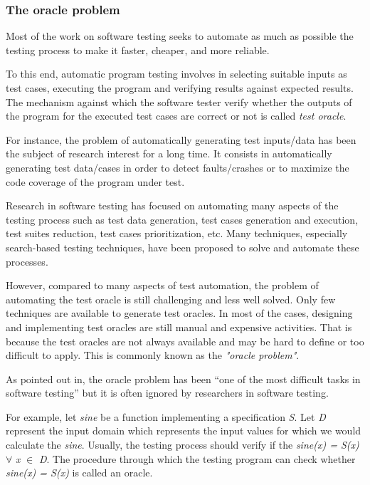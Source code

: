 \subsubsection{The oracle problem}

Most of the work on software testing seeks to automate as much as possible the testing process to make it faster, cheaper, and more reliable. 

To this end, automatic program testing involves in selecting suitable inputs as test cases, executing the program and verifying results against expected results. 
The mechanism against which the software tester verify whether the outputs of the program for the executed test cases are correct or not is called \textit{test oracle}. 

For instance, the problem of automatically generating test inputs/data has been the subject of research interest for a long time. It consists in automatically generating test data/cases in order to detect faults/crashes or to maximize the code coverage of the program under test. 


Research in software testing has focused on automating many aspects of the testing process such as test data generation, test cases generation and execution, test suites reduction, test cases prioritization, etc. Many techniques, especially search-based testing techniques, have been proposed to solve and automate these processes\cite{ali2010systematic}.

However, compared to many aspects of test automation, the problem of automating the test oracle is still challenging and less well solved. Only few techniques are available to generate test oracles. In most of the cases, designing and implementing test oracles are still manual and expensive activities. That is because the test oracles are not always available and may be hard to define or too difficult to apply\cite{barr2015oracle}. This is commonly known as the \textit{"oracle problem"}. 

As pointed out in\cite{manolache2001software}, the oracle problem has been “one of the most difficult tasks in software testing” but it is often ignored by researchers in software testing.

For example, let \textit{sine} be a function implementing a specification \textit{S}. Let \textit{D} represent the input domain which represents the input values for which we would calculate the \textit{sine}. Usually, the testing process should verify if the \textit{sine(x) = S(x)} $\forall$ \textit{x} $\in$ \textit{D}. The procedure through which the testing program can check whether \textit{sine(x) = S(x)} is called an oracle.


